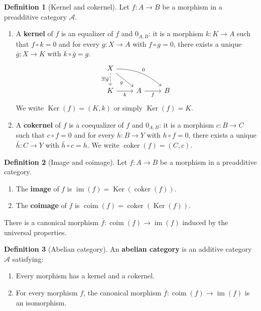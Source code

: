 \documentclass[a4paper,12pt]{book}
\DeclareMathOperator{\im}{im}
\DeclareMathOperator{\Ker}{Ker}
\DeclareMathOperator{\coker}{coker}
\theoremstyle{definition}
\newtheorem{definition}{Definition}[section]
\theoremstyle{plain}
\theoremstyle{remark}
\begin{document}
\begin{definition}[Kernel and cokernel]\label{def:kernel-cokernel}
Let $f \colon A \to B$ be a morphism in a preadditive category $\mathcal{A}$.
\begin{enumerate}
    \item A \textbf{kernel} of $f$ is an equalizer of $f$ and $0_{A,B}$: it is a morphism
    $k \colon K \to A$ such that $f \circ k = 0$ and for every $g \colon X \to A$ with
    $f \circ g = 0$, there exists a unique $\bar{g} \colon X \to K$ with $k \circ \bar{g} = g$.
    \[
    \begin{tikzcd}
        X \arrow[rd, "g"'] \arrow[rrd, "0", bend left=20] \arrow[d, dashed, "\exists!\bar{g}"'] \\
        K \arrow[r, "k"'] & A \arrow[r, "f"'] & B
    \end{tikzcd}
    \]
    We write $\Ker(f) = (K, k)$ or simply $\Ker(f) = K$.
    \item A \textbf{cokernel} of $f$ is a coequalizer of $f$ and $0_{A,B}$: it is a morphism
    $c \colon B \to C$ such that $c \circ f = 0$ and for every $h \colon B \to Y$ with
    $h \circ f = 0$, there exists a unique $\bar{h} \colon C \to Y$ with $\bar{h} \circ c = h$.
    We write $\coker(f) = (C, c)$.
\end{enumerate}
\end{definition}

\begin{definition}[Image and coimage]\label{def:image-coimage}
Let $f \colon A \to B$ be a morphism in a preadditive category.
\begin{enumerate}
    \item The \textbf{image} of $f$ is $\im(f) = \Ker(\coker(f))$.
    \item The \textbf{coimage} of $f$ is $\operatorname{coim}(f) = \coker(\Ker(f))$.
\end{enumerate}
There is a canonical morphism $\overline{f} \colon \operatorname{coim}(f) \to \im(f)$
induced by the universal properties.
\end{definition}

\begin{definition}[Abelian category]\label{def:abelian-cat}
An \textbf{abelian category} is an additive category $\mathcal{A}$ satisfying:
\begin{enumerate}
    \item[(AB1)] Every morphism has a kernel and a cokernel.
    \item[(AB2)] For every morphism $f$, the canonical morphism
    $\overline{f} \colon \operatorname{coim}(f) \to \im(f)$ is an isomorphism.
\end{enumerate}
\end{definition}
\end{document}
